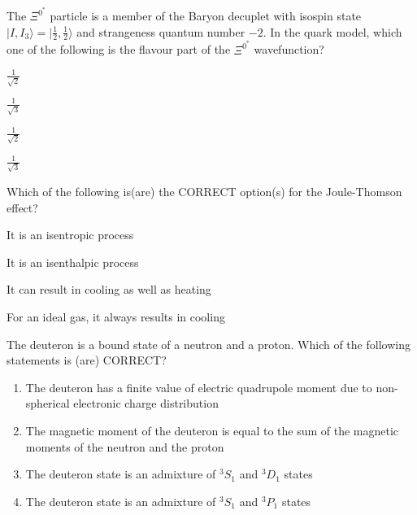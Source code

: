 \iffalse
\chapter{2023}
\author{AI24BTECH11014}
\section{ph}
\fi

\item The $\Xi^{0^{*}}$ particle is a member of the Baryon decuplet with isospin state $|I, I_{3}\rangle = | \frac{1}{2}, \frac{1}{2} \rangle$ and strangeness quantum number $-2$. In the quark model, which one of the following is the flavour part of the $\Xi^{0^{*}}$ wavefunction?
\begin{enumerate}
\begin{multicols}{4}
\item $\frac{1}{\sqrt{2}}$
\item $\frac{1}{\sqrt{3}}$ 
\item $\frac{1}{\sqrt{2}}$ 
\item $\frac{1}{\sqrt{3}}$ 
\end{multicols}
\end{enumerate}

\item Which of the following is(are) the CORRECT option(s) for the Joule-Thomson effect?
\begin{enumerate}
\begin{multicols}{2}
\item It is an isentropic process
\item It is an isenthalpic process
\item It can result in cooling as well as heating
\item For an ideal gas, it always results in cooling
\end{multicols}
\end{enumerate}


\item The deuteron is a bound state of a neutron and a proton. Which of the following statements is (are) CORRECT?
\begin{enumerate}
\item The deuteron has a finite value of electric quadrupole moment due to non-spherical electronic charge distribution
\item The magnetic moment of the deuteron is equal to the sum of the magnetic moments of the neutron and the proton
\item The deuteron state is an admixture of $^{3}S_{1}$ and $^{3}D_{1}$ states
\item The deuteron state is an admixture of $^{3}S_{1}$ and $^{3}P_{1}$ states
\end{enumerate}


